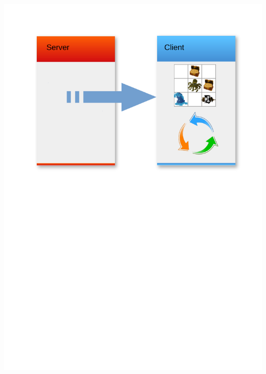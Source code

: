 

\begin{frame}
	\begin{center}
		\includegraphics[scale=0.5]{simulation/Simulation1.pdf}
	\end{center}
\end{frame}

